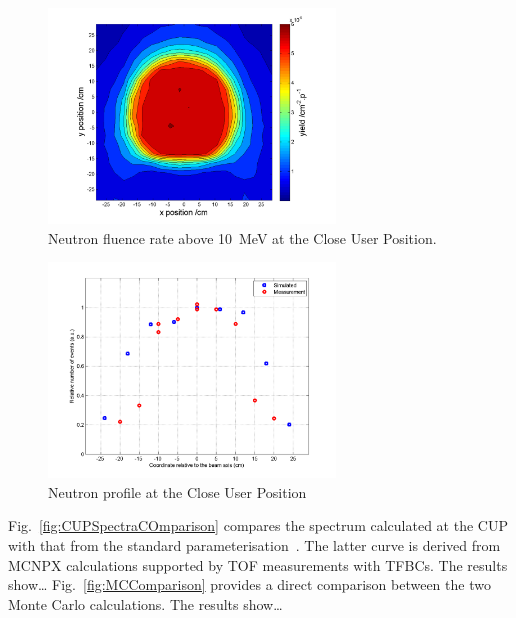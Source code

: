 \documentclass[11pt,a4paper]{IEEEtran}
\let\MYoriglatexcaption\caption
\renewcommand{\caption}[2][\relax]{\MYoriglatexcaption[#2]{#2}}
\begin{document}
\begin{figure}[t]
    \includegraphics[width=3in]{CUP10ColSpatialDistribution10MeV.png}
    \caption{Neutron fluence rate above \SI{10}{\MeV} at the Close User Position.}
    \label{fig:CUPDensity}
\end{figure}

\begin{figure}[t]
    \includegraphics[width=3in]{CUPTOF10beamproRADECS.png}
    \caption{Neutron profile at the Close User Position}
    \label{fig:CUPProfile}
\end{figure}

Fig.~\ref{fig:CUPSpectraCOmparison} compares the spectrum calculated at the CUP with that from the standard parameterisation~\cite{Prokofiev14}.
The latter curve is derived from MCNPX calculations supported by TOF measurements with TFBCs.
The results show\ldots{}
Fig.~\ref{fig:MCComparison} provides a direct comparison between the two Monte Carlo calculations.
The results show\ldots{}
\end{document}
